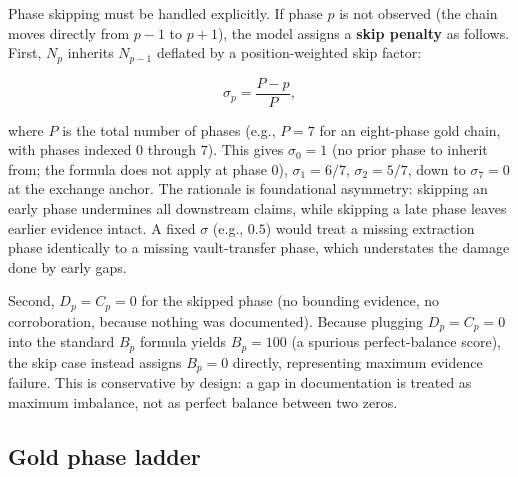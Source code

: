 \documentclass[12pt]{article}
\begin{document}
Phase skipping must be handled explicitly. If phase \(p\) is not
observed (the chain moves directly from \(p-1\) to \(p+1\)), the model
assigns a \textbf{skip penalty} as follows. First, \(N_p\) inherits
\(N_{p-1}\) deflated by a position-weighted skip factor:

\[\sigma_p = \frac{P - p}{P},\]

where \(P\) is the total number of phases (e.g., \(P = 7\) for an
eight-phase gold chain, with phases indexed \(0\) through \(7\)). This
gives \(\sigma_0 = 1\) (no prior phase to inherit from; the formula does
not apply at phase 0), \(\sigma_1 = 6/7\), \(\sigma_2 = 5/7\), down to
\(\sigma_7 = 0\) at the exchange anchor. The rationale is foundational
asymmetry: skipping an early phase undermines all downstream claims,
while skipping a late phase leaves earlier evidence intact. A fixed
\(\sigma\) (e.g., \(0.5\)) would treat a missing extraction phase
identically to a missing vault-transfer phase, which understates the
damage done by early gaps.

Second, \(D_p = C_p = 0\) for the skipped phase (no bounding evidence,
no corroboration, because nothing was documented). Because plugging
\(D_p = C_p = 0\) into the standard \(B_p\) formula yields \(B_p = 100\)
(a spurious perfect-balance score), the skip case instead assigns
\(B_p = 0\) directly, representing maximum evidence failure. This is
conservative by design: a gap in documentation is treated as maximum
imbalance, not as perfect balance between two zeros.

\subsection{Gold phase ladder}\label{gold-phase-ladder}
\end{document}
